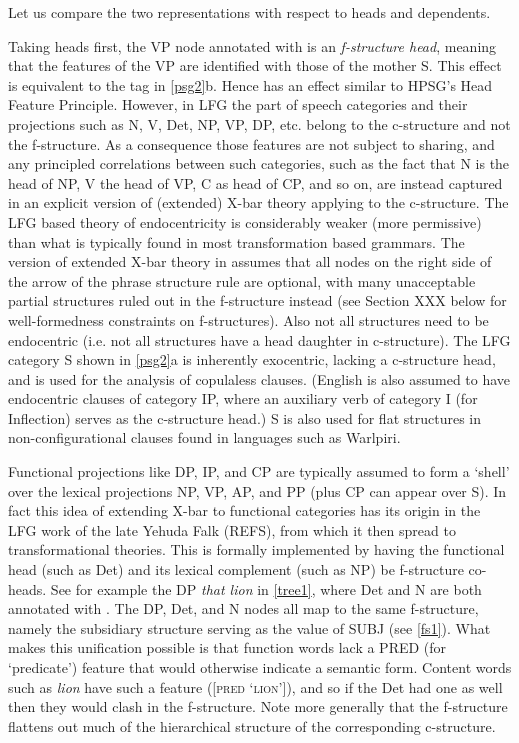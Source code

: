 \documentclass[output=paper
                ,modfonts
                ,nonflat
	        ,collection
	        ,collectionchapter
	        ,collectiontoclongg
 	        ,biblatex
                ,babelshorthands
                ,newtxmath
                ,draftmode
                ,colorlinks, citecolor=brown
]{./langsci/langscibook}
\begin{document}
\ex 
{
\phraserule{S[\textsc{fs} \fbox{1}]}{\rulenode{DP[\textsc{fs} \fbox{2}]}  \rulenode{VP[\textsc{fs}  \fbox{1}[\textsc{subj} \fbox{2}]}}}
\zl

\noindent
Let us compare the two representations with respect to heads and dependents.

Taking heads first, the VP node annotated with \updown is an \textit{f-structure head}, meaning that the features of the VP are identified with those of the mother S.  This effect is equivalent to the tag  in \ref{psg2}b.    Hence  \updown has an effect similar to HPSG's Head Feature Principle.  However, in LFG the part of speech categories and their projections such as N, V, Det, NP, VP, DP, etc. belong to the c-structure and not the f-structure.  As a consequence those features are not subject to sharing, and any principled correlations between such categories, such as the fact that N is the head of NP, V the head of VP, C as head of CP, and so on, are instead captured in an explicit version of (extended) X-bar theory applying to the c-structure.  The  LFG based theory of endocentricity is considerably weaker (more permissive) than what is typically found in most transformation based grammars.  The version of extended X-bar theory in \cite[ch. ]{BATW2015a} assumes that all nodes on the right side of the arrow of the phrase structure rule are optional, with many unacceptable partial structures ruled out in the f-structure instead (see Section XXX below for well-formedness constraints on f-structures).  Also not all structures need to be endocentric (i.e. not all structures have a head daughter in c-structure).  The LFG category S shown in \ref{psg2}a is inherently exocentric, lacking a c-structure head, and is used for the analysis of copulaless clauses.   (English is also assumed to have endocentric clauses of category IP, where an auxiliary verb of category I (for Inflection) serves as the c-structure head.)  S is also used for flat structures in non-configurational clauses found in languages such as Warlpiri.   

Functional projections like DP, IP, and CP are typically assumed to form a `shell' over the lexical projections NP, VP, AP, and PP (plus CP can appear over S).  In fact this idea of extending X-bar to functional categories has its origin in the LFG work of the late Yehuda Falk (REFS), from which it then spread to  transformational theories.   This is formally implemented by having the functional head (such as Det) and its lexical complement (such as NP) be f-structure co-heads.  See for example the DP \textit{that lion} in \ref{tree1}, where Det and N are both annotated with \updown .  The DP, Det, and N nodes all map to the same f-structure, namely the subsidiary structure serving as the value of SUBJ (see \ref{fs1}).  What makes this unification possible is that function words lack a PRED (for `predicate') feature that would otherwise indicate a semantic form.  Content words such as \textit{lion} have such a feature ([\textsc{pred} `\textsc{lion}']), and so if the Det had one as well then they would clash in the f-structure.  Note more generally that the f-structure flattens out much of the hierarchical structure of the corresponding c-structure.  
\end{document}
